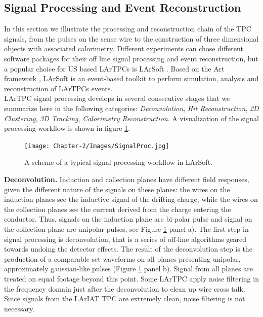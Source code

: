 \subsection{Signal Processing and Event Reconstruction}\label{sec:SignalProc}
In this section we illustrate the processing and reconstruction chain of the TPC signals, from the pulses on the sense wire to the construction of three dimensional objects with associated calorimetry. Different experiments can chose different software packages for their off line signal processing and event reconstruction, but  a popular choice for  US based  LArTPCs is LArSoft \cite{EricFChurck}. Based on the Art framework \cite{Green:2012gv}, LArSoft is an event-based toolkit to perform simulation, analysis and reconstruction of LArTPCs events.\\

LArTPC signal processing develops in several consecutive stages that we summarize here in the following categories: \emph{Deconvolution}, \emph{Hit Reconstruction}, \emph{2D Clustering}, \emph{3D Tracking}, \emph{Calorimetry Reconstruction}.  A visualization of the signal processing workflow is shown in figure \ref{fig:SignalProc}.\\

\begin{figure}[hbpt]
\centering
\texttt{[image: Chapter-2/Images/SignalProc.jpg]}
\caption{A scheme of a typical signal processing workflow in LArSoft.}
\label{fig:SignalProc}
\end{figure}

\textbf{Deconvolution.} Induction and collection planes have different field responses, given the different nature of the signals on these planes: the wires on the induction planes see the inductive signal of the drifting charge, while the wires on the collection planes see the current derived from the charge entering the conductor. Thus, signals on the induction plane are bi-polar pulse and signal on the collection plane are unipolar pulses, see Figure \ref{fig:SignalProc} panel a). The first step in signal processing is deconvolution, that is a series of off-line algorithms geared towards undoing the detector effects. The result of the deconvolution step is  the production of  a comparable set waveforms on all planes presenting unipolar, approximately gaussian-like pulses (Figure \ref{fig:SignalProc} panel b). Signal from all planes are treated on equal footage beyond this point. Some LArTPC apply noise filtering in the frequency domain just after the deconvolution to clean up wire cross talk. Since signals from the LArIAT TPC are extremely clean, noise filtering is not necessary.\\



